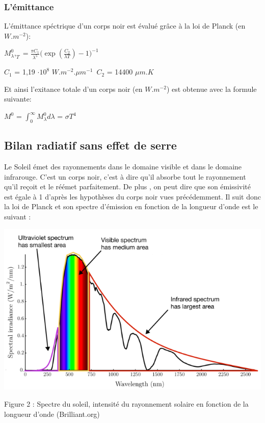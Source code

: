 \documentclass[a4paper, 12pt]{report} %
\begin{document}
\subsubsection{L'émittance} 
\noindent L'émittance spéctrique d'un corps noir est évalué grâce à la loi de Planck 
(en $W.m^{-2}$): \vspace{\baselineskip}

\begin{center}
$M^{0}_\lambda,_T= \frac{\pi C_1}{\lambda^5} \biggl(\exp(\frac{C_2}{\lambda T}) - 1\biggr)^{-1}$ 

$C_1$ = 1,19 $\cdot 10^{8}$ $W.m^{-2}.\mu m^{-1}$\
$C_2$ = 14400 $\mu m.K$ \\
\end{center}
Et ainsi l'exitance totale d'un corps noir (en $W.m^{-2}$) est obtenue avec la formule suivante:

\hfil $M^{0}$ = $\int_{0}^{\infty} M^{0}_\lambda d\lambda$ = $\sigma T^{4}$ 

\par

\subsection{Bilan radiatif sans effet de serre} 

Le Soleil émet des rayonnements dans le domaine visible et 
dans le domaine infrarouge. C'est un corps noir, c'est à dire
qu'il absorbe tout le rayonnement qu'il reçoit et le réémet 
parfaitement. De plus , on peut dire que son émissivité est 
égale à 1 d'après les hypothèses du corps noir vues précédemment. Il suit donc la loi de Planck et son spectre d'émission en fonction de 
la longueur d'onde est le suivant : 
\begin{center}
    \includegraphics[scale=0.85]{Images/Spectre Soleil.png}
    
    Figure 2 : Spectre du soleil, intensité du rayonnement solaire en fonction de la longueur d’onde (Brilliant.org)  
\end{center} \vspace{\baselineskip}
\end{document}
